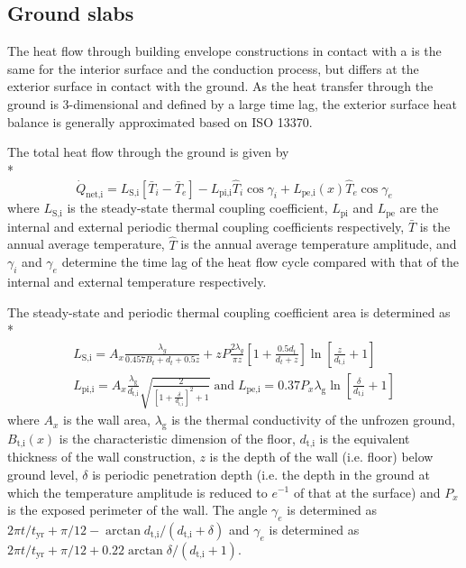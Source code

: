 \subsection{Ground slabs}

The heat flow through building envelope constructions in contact with a  is the same for the interior surface and the  conduction process, but differs at the exterior surface in contact with the ground. As the heat transfer through the ground is 3-dimensional and defined by a large time lag, the exterior surface heat balance is generally approximated based on ISO 13370.

The total heat flow through the ground is given by \\*
\begin{equation}
\dot{Q}_{\textrm{net,i}} = L_{\textrm{S,i}} \left[ \bar{T}_{i} - \bar{T}_{e} \right] - L_{\textrm{pi,i}} \hat{T}_{i} \cos \gamma_{i} + L_{\textrm{pe,i}}(x) \hat{T}_{e} \cos \gamma_{e}
\end{equation}
where $L_{\textrm{S,i}}$ is the steady-state thermal coupling coefficient, $L_{\textrm{pi}}$ and $L_{\textrm{pe}}$ are the internal and external periodic thermal coupling coefficients respectively, $\bar{T}$ is the annual average temperature, $\hat{T}$ is the annual average temperature amplitude, and $\gamma_{i}$ and $\gamma_{e}$ determine the time lag of the heat flow cycle compared with that of the internal and external temperature respectively.

The steady-state and periodic thermal coupling coefficient area is determined as \\*
\begin{gather}
L_{\textrm{S,i}} = A_{x} \frac{\lambda_{g}}{0.457 B_{t} + d_{t} + 0.5 z}+ z P \frac{2 \lambda_{g}}{\pi z} \left[1+\frac{0.5 d_{t}}{d_{t}+z}\right] \ln \left[\frac{z}{d_{\textrm{t,i}}}+1\right] \\
L_{\textrm{pi,i}} = A_{x} \frac{\lambda_{\textrm{g}}}{d_{\textrm{t,i}}} \sqrt{\frac{2}{\left[ 1 + \frac{\delta}{d_{\textrm{t,i}}}\right]^{2} +1}} \; \mbox{and} \;
L_{\textrm{pe,i}} = 0.37 P_{x} \lambda_{\textrm{g}} \ln{\left[\frac{\delta}{d_{\textrm{t,i}}} + 1\right]}
\end{gather}
where $A_{x}$ is the wall area, $\lambda_{\textrm{g}}$ is the thermal conductivity of the unfrozen ground, $B_{\textrm{t,i}}(x)$ is the characteristic dimension of the floor, $d_{\textrm{t,i}}$ is the equivalent thickness of the wall construction, $z$ is the depth of the wall (i.e. floor) below ground level, $\delta$ is periodic penetration depth (i.e. the depth in the ground at which the temperature amplitude is reduced to $e^{-1}$ of that at the surface) and $P_{x}$ is the exposed perimeter of the wall. The angle $\gamma_{e}$ is determined as $2 \pi t / t_{\textrm{yr}} + \pi / 12 - \arctan{d_{\textrm{t,i}} / \left( d_{\textrm{t,i}} + \delta \right)}$ and $\gamma_{e}$ is determined as $2 \pi t / t_{\textrm{yr}} + \pi / 12 + 0.22 \arctan{\delta / \left( d_{\textrm{t,i}} + 1 \right)}$.

